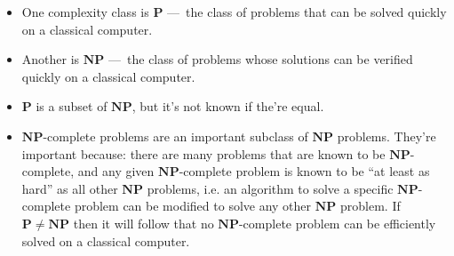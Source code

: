 \documentclass{article}
\begin{document}
\begin{itemize}
  \item One complexity class is $\mathbf{P}$ — the class of problems that can be solved quickly on a classical computer.

  \item Another is $\mathbf{NP}$ — the class of problems whose solutions can be verified quickly on a classical computer.

  \item $\mathbf{P}$ is a subset of $\mathbf{NP}$, but it's not known if the're equal.

  \item $\mathbf{NP}$-complete problems are an important subclass of $\mathbf{NP}$ problems. They're important because: there are many problems that are known to be $\mathbf{NP}$-complete, and any given $\mathbf{NP}$-complete problem is known to be ``at least as hard'' as all other $\mathbf{NP}$ problems, i.e. an algorithm to solve a specific $\mathbf{NP}$-complete problem can be modified to solve any other $\mathbf{NP}$ problem. If $\mathbf{P} \ne \mathbf{NP}$ then it will follow that no $\mathbf{NP}$-complete problem can be efficiently solved on a classical computer.
\end{itemize}
\end{document}
